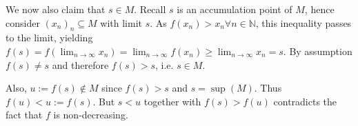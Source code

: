 \begin{solution}
    We now also claim that \( s \in M \). Recall \( s \) is an accumulation point of \( M \), hence consider \( (x_n)_n \subseteq M \) with limit \( s \). As \( f(x_n) > x_n \forall n \in \mathbb{N} \), this inequality passes to the limit, yielding \( f(s)= f(\lim_{n\to\infty} x_n) =\lim_{n\to\infty} f(x_n) \ge \lim_{n\to\infty} x_n=s \). By assumption \( f(s)\neq s \) and therefore \( f(s)>s \), i.e. \( s\in M \).\newline

    Also, \( u:=f(s)\notin M \) since \( f(s)>s \) and \( s=\sup(M) \). Thus \( f(u)<u:=f(s) \). But \( s<u \) together with \( f(s)>f(u) \) contradicts the fact that \( f \) is non-decreasing.
\end{solution}
